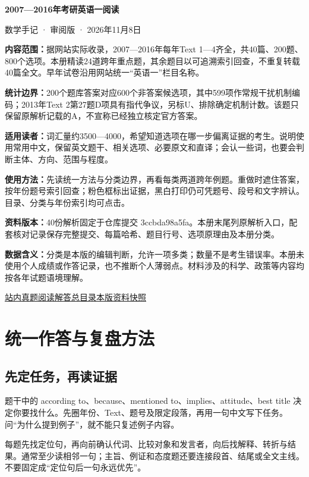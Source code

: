 \documentclass[11pt,a4paper]{article}
\begin{document}
\begin{center}
{\LARGE\bfseries 2007—2016年考研英语一阅读\par}
\vspace{5pt}{\LARGE\bfseries 干扰项规律与解题方法\par}
\vspace{10pt}{\large 跨年份证据比较与长期复习专册\par}
\vspace{8pt}数学手记 · 审阅版 · 2026年11月8日
\end{center}

\noindent\textbf{内容范围：}据网站实际收录，2007—2016年每年Text 1—4齐全，共40篇、200题、800个选项。本册精读24道跨年重点题，其余题目以可追溯索引回查，不重复转载40篇全文。早年试卷沿用网站统一“英语一”栏目名称。\par
\noindent\textbf{统计边界：}200个题库答案对应600个非答案候选项，其中599项作常规干扰机制编码；2013年Text 2第27题D项具有指代争议，另标U、排除确定机制计数。该题只保留原解析记载的A，不宣称已经独立核定官方答案。\par
\noindent\textbf{适用读者：}词汇量约3500—4000，希望知道选项在哪一步偏离证据的考生。说明使用常用中文，保留英文题干、相关选项、必要原文和直译；会认一些词，也要会判断主体、方向、范围与程度。\par
\noindent\textbf{使用方法：}先读统一方法与分类边界，再看每类两道跨年例题。重做时遮住答案，按年份题号索引回查；粉色框标出证据，黑白打印仍可凭题号、段号和文字辨认。目录、分类与年份索引均可点击。\par
\noindent\textbf{资料版本：}40份解析固定于仓库提交 3ccbda98a5fa。本册末尾列原解析入口，配套核对记录保存完整提交、每篇哈希、题目行号、选项原理由及本册分类。\par
\noindent\textbf{数据含义：}分类是本版的编辑判断，允许一项多类；数量不是考生错误率。本册未使用个人成绩或作答记录，也不推断个人薄弱点。材料涉及的科学、政策等内容均按各年试题语境理解。\par
\noindent \href{https://zj139.github.io/math-notes/english/reading-answers/}{站内真题阅读解答总目录}\quad \href{https://github.com/ZJ139/math-notes/tree/3ccbda98a5fa9e6f3553cd7e90493f5e322b42bf}{本版资料快照}
\clearpage\section{统一作答与复盘方法}\label{methods}
\subsection{先定任务，再读证据}
题干中的 according to、because、mentioned to、implies、attitude、best title 决定你要找什么。先圈年份、Text、题号及限定段落，再用一句中文写下任务。问“为什么提到例子”，就不能只复述例子内容。\par
每题先找定位句，再向前确认代词、比较对象和发言者，向后找解释、转折与结果。通常至少读相邻一句；主旨、例证和态度题还要连接段首、结尾或全文主线。不要固定成“定位句后一句永远优先”。\par
\end{document}
